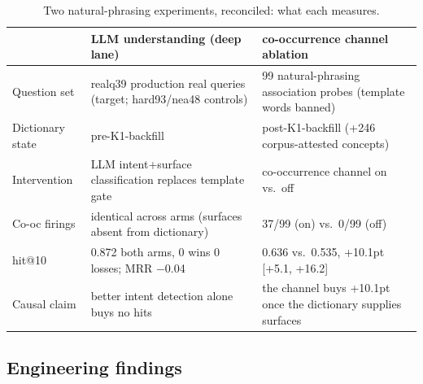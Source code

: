 \documentclass[sigconf,nonacm]{acmart}
\begin{document}
\begin{table}[!t]
\centering
\caption{Two natural-phrasing experiments, reconciled: what each measures.}
\label{tab:naturalbridge}
\small
\begin{tabularx}{\textwidth}{lXX}
\toprule
 & LLM understanding (deep lane) & co-occurrence channel ablation \\
\midrule
Question set & realq39 production real queries (target; hard93/nea48 controls) & 99 natural-phrasing association probes (template words banned) \\
Dictionary state & pre-K1-backfill & post-K1-backfill (+246 corpus-attested concepts) \\
Intervention & LLM intent+surface classification replaces template gate & co-occurrence channel on vs.\ off \\
Co-oc firings & identical across arms (surfaces absent from dictionary) & 37/99 (on) vs.\ 0/99 (off) \\
hit@10 & 0.872 both arms, 0 wins 0 losses; MRR $-$0.04 & 0.636 vs.\ 0.535, +10.1pt [+5.1, +16.2] \\
Causal claim & better intent detection alone buys no hits & the channel buys +10.1pt once the dictionary supplies surfaces \\
\bottomrule
\end{tabularx}
\end{table}

\subsection{Engineering findings}
\label{sec:eng}
\end{document}

